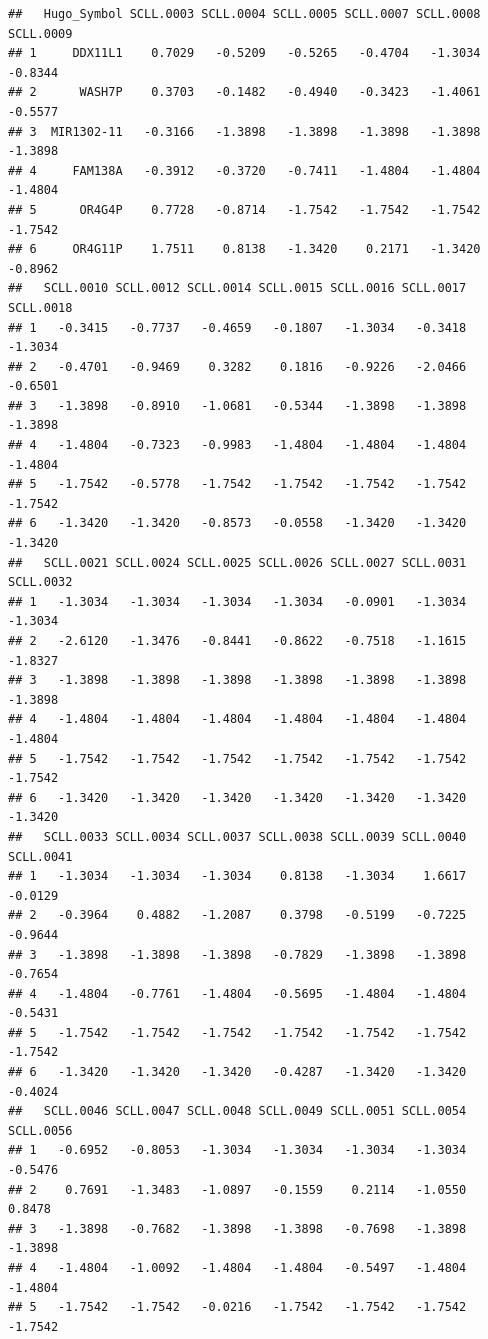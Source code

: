 \documentclass[
]{article}
\begin{document}
\begin{verbatim}
##   Hugo_Symbol SCLL.0003 SCLL.0004 SCLL.0005 SCLL.0007 SCLL.0008 SCLL.0009
## 1     DDX11L1    0.7029   -0.5209   -0.5265   -0.4704   -1.3034   -0.8344
## 2      WASH7P    0.3703   -0.1482   -0.4940   -0.3423   -1.4061   -0.5577
## 3  MIR1302-11   -0.3166   -1.3898   -1.3898   -1.3898   -1.3898   -1.3898
## 4     FAM138A   -0.3912   -0.3720   -0.7411   -1.4804   -1.4804   -1.4804
## 5      OR4G4P    0.7728   -0.8714   -1.7542   -1.7542   -1.7542   -1.7542
## 6     OR4G11P    1.7511    0.8138   -1.3420    0.2171   -1.3420   -0.8962
##   SCLL.0010 SCLL.0012 SCLL.0014 SCLL.0015 SCLL.0016 SCLL.0017 SCLL.0018
## 1   -0.3415   -0.7737   -0.4659   -0.1807   -1.3034   -0.3418   -1.3034
## 2   -0.4701   -0.9469    0.3282    0.1816   -0.9226   -2.0466   -0.6501
## 3   -1.3898   -0.8910   -1.0681   -0.5344   -1.3898   -1.3898   -1.3898
## 4   -1.4804   -0.7323   -0.9983   -1.4804   -1.4804   -1.4804   -1.4804
## 5   -1.7542   -0.5778   -1.7542   -1.7542   -1.7542   -1.7542   -1.7542
## 6   -1.3420   -1.3420   -0.8573   -0.0558   -1.3420   -1.3420   -1.3420
##   SCLL.0021 SCLL.0024 SCLL.0025 SCLL.0026 SCLL.0027 SCLL.0031 SCLL.0032
## 1   -1.3034   -1.3034   -1.3034   -1.3034   -0.0901   -1.3034   -1.3034
## 2   -2.6120   -1.3476   -0.8441   -0.8622   -0.7518   -1.1615   -1.8327
## 3   -1.3898   -1.3898   -1.3898   -1.3898   -1.3898   -1.3898   -1.3898
## 4   -1.4804   -1.4804   -1.4804   -1.4804   -1.4804   -1.4804   -1.4804
## 5   -1.7542   -1.7542   -1.7542   -1.7542   -1.7542   -1.7542   -1.7542
## 6   -1.3420   -1.3420   -1.3420   -1.3420   -1.3420   -1.3420   -1.3420
##   SCLL.0033 SCLL.0034 SCLL.0037 SCLL.0038 SCLL.0039 SCLL.0040 SCLL.0041
## 1   -1.3034   -1.3034   -1.3034    0.8138   -1.3034    1.6617   -0.0129
## 2   -0.3964    0.4882   -1.2087    0.3798   -0.5199   -0.7225   -0.9644
## 3   -1.3898   -1.3898   -1.3898   -0.7829   -1.3898   -1.3898   -0.7654
## 4   -1.4804   -0.7761   -1.4804   -0.5695   -1.4804   -1.4804   -0.5431
## 5   -1.7542   -1.7542   -1.7542   -1.7542   -1.7542   -1.7542   -1.7542
## 6   -1.3420   -1.3420   -1.3420   -0.4287   -1.3420   -1.3420   -0.4024
##   SCLL.0046 SCLL.0047 SCLL.0048 SCLL.0049 SCLL.0051 SCLL.0054 SCLL.0056
## 1   -0.6952   -0.8053   -1.3034   -1.3034   -1.3034   -1.3034   -0.5476
## 2    0.7691   -1.3483   -1.0897   -0.1559    0.2114   -1.0550    0.8478
## 3   -1.3898   -0.7682   -1.3898   -1.3898   -0.7698   -1.3898   -1.3898
## 4   -1.4804   -1.0092   -1.4804   -1.4804   -0.5497   -1.4804   -1.4804
## 5   -1.7542   -1.7542   -0.0216   -1.7542   -1.7542   -1.7542   -1.7542

\end{verbatim}
\end{document}
